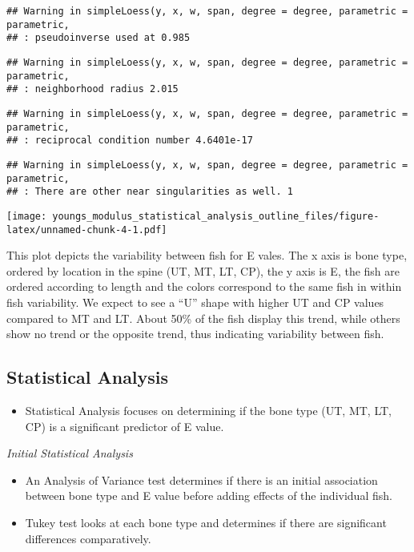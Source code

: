 \documentclass[
]{article}
\providecommand{\tightlist}{%
  \setlength{\itemsep}{0pt}\setlength{\parskip}{0pt}}
\begin{document}
\begin{verbatim}
## Warning in simpleLoess(y, x, w, span, degree = degree, parametric = parametric,
## : pseudoinverse used at 0.985
\end{verbatim}

\begin{verbatim}
## Warning in simpleLoess(y, x, w, span, degree = degree, parametric = parametric,
## : neighborhood radius 2.015
\end{verbatim}

\begin{verbatim}
## Warning in simpleLoess(y, x, w, span, degree = degree, parametric = parametric,
## : reciprocal condition number 4.6401e-17
\end{verbatim}

\begin{verbatim}
## Warning in simpleLoess(y, x, w, span, degree = degree, parametric = parametric,
## : There are other near singularities as well. 1
\end{verbatim}

\texttt{[image: youngs\_modulus\_statistical\_analysis\_outline\_files/figure-latex/unnamed-chunk-4-1.pdf]}

This plot depicts the variability between fish for E vales. The x axis
is bone type, ordered by location in the spine (UT, MT, LT, CP), the y
axis is E, the fish are ordered according to length and the colors
correspond to the same fish in within fish variability. We expect to see
a ``U'' shape with higher UT and CP values compared to MT and LT. About
50\% of the fish display this trend, while others show no trend or the
opposite trend, thus indicating variability between fish.

\subsection{Statistical Analysis}\label{statistical-analysis}

\begin{itemize}
\tightlist
\item
  Statistical Analysis focuses on determining if the bone type (UT, MT,
  LT, CP) is a significant predictor of E value.
\end{itemize}

\emph{Initial Statistical Analysis}

\begin{itemize}
\tightlist
\item
  An Analysis of Variance test determines if there is an initial
  association between bone type and E value before adding effects of the
  individual fish.
\item
  Tukey test looks at each bone type and determines if there are
  significant differences comparatively.
\end{itemize}
\end{document}

